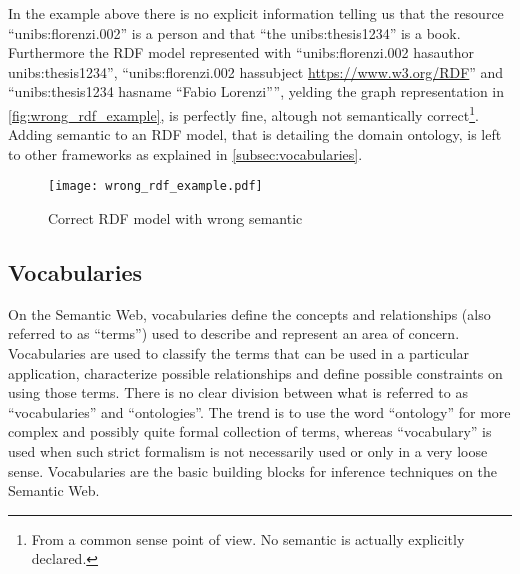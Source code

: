 In the example above there is no explicit information telling us that the resource ``unibs:florenzi.002'' is a person and that ``the unibs:thesis1234'' is a book. Furthermore the RDF model represented with ``unibs:florenzi.002 has\textunderscore author unibs:thesis1234'', ``unibs:florenzi.002 has\textunderscore subject \url{https://www.w3.org/RDF}'' and ``unibs:thesis1234   has\textunderscore name ``Fabio Lorenzi'''', yelding the graph representation in \autoref{fig:wrong_rdf_example}, is perfectly fine, altough not semantically correct\footnote{From a common sense point of view. No semantic is actually explicitly declared.}.
Adding semantic to an RDF model, that is detailing the domain ontology, is left to other frameworks as explained in \autoref{subsec:vocabularies}.

\begin{figure}
  \centering
  \texttt{[image: wrong\_rdf\_example.pdf]}
  \caption{Correct RDF model with wrong semantic}
  \label{fig:wrong_rdf_example}
\end{figure}

\subsection{Vocabularies} \label{subsec:vocabularies}
On the Semantic Web, vocabularies define the concepts and relationships (also referred to as ``terms'') used to describe and represent an area of concern. Vocabularies are used to classify the terms that can be used in a particular application, characterize possible relationships and define possible constraints on using those terms. There is no clear division between what is referred to as ``vocabularies'' and ``ontologies''. The trend is to use the word ``ontology'' for more complex and possibly quite formal collection of terms, whereas ``vocabulary'' is used when such strict formalism is not necessarily used or only in a very loose sense. Vocabularies are the basic building blocks for inference techniques on the Semantic Web.


